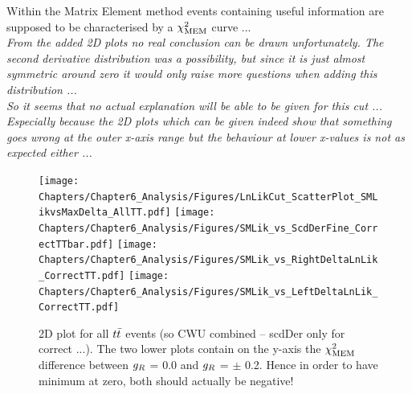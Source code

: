 Within the Matrix Element method events containing useful information are supposed to be characterised by a $\chi^{2}_{\textrm{MEM}}$ curve ...\\
\textit{From the added 2D plots no real conclusion can be drawn unfortunately. The second derivative distribution was a possibility, but since it is just almost symmetric around zero it would only raise more questions when adding this distribution ...\\ So it seems that no actual explanation will be able to be given for this cut ...\\ Especially because the 2D plots which can be given indeed show that something goes wrong at the outer x-axis range but the behaviour at lower x-values is not as expected either ...}
\\
\begin{figure}[h!t]
 \centering
 \texttt{[image: Chapters/Chapter6\_Analysis/Figures/LnLikCut\_ScatterPlot\_SMLikvsMaxDelta\_AllTT.pdf]}
 \texttt{[image: Chapters/Chapter6\_Analysis/Figures/SMLik\_vs\_ScdDerFine\_CorrectTTbar.pdf]}
 \texttt{[image: Chapters/Chapter6\_Analysis/Figures/SMLik\_vs\_RightDeltaLnLik\_CorrectTT.pdf]}
 \texttt{[image: Chapters/Chapter6\_Analysis/Figures/SMLik\_vs\_LeftDeltaLnLik\_CorrectTT.pdf]}
 \caption{2D plot for all $t\bar{t}$ events (so CWU combined -- scdDer only for correct ...). The two lower plots contain on the y-axis the $\chi^{2}_{\textrm{MEM}}$ difference between $g_{R}$ = 0.0 and $g_{R}$ = $\pm$ 0.2. Hence in order to have minimum at zero, both should actually be negative!} \label{fig::SMLik2D}
\end{figure}



%


